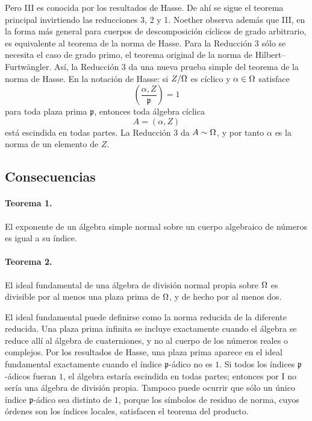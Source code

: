 Pero III es conocida por los resultados de Hasse. De ahí se sigue el teorema principal invirtiendo las reducciones 3, 2 y 1. Noether observa además que III, en la forma más general para cuerpos de descomposición cíclicos de grado arbitrario, es equivalente al teorema de la norma de Hasse. Para la Reducción 3 sólo se necesita el caso de grado primo, el teorema original de la norma de Hilbert--Furtwängler. Así, la Reducción 3 da una nueva prueba simple del teorema de la norma de Hasse. En la notación de Hasse: si \(Z/\Omega\) es cíclico y \(\alpha\in\Omega\) satisface
\[
        \left(\frac{\alpha,Z}{\mathfrak p}\right)=1
\]
para toda plaza prima \(\mathfrak p\), entonces toda álgebra cíclica
\[
        A=(\alpha,Z)
\]
está escindida en todas partes. La Reducción 3 da \(A\sim\Omega\), y por tanto \(\alpha\) es la norma de un elemento de \(Z\).

\subsection*{Consecuencias}

\paragraph{Teorema 1.}
El exponente de un álgebra simple normal sobre un cuerpo algebraico de números es igual a su índice.

\paragraph{Teorema 2.}
El ideal fundamental de una álgebra de división normal propia sobre \(\Omega\) es divisible por al menos una plaza prima de \(\Omega\), y de hecho por al menos dos.

El ideal fundamental puede definirse como la norma reducida de la diferente reducida. Una plaza prima infinita se incluye exactamente cuando el álgebra se reduce allí al álgebra de cuaterniones, y no al cuerpo de los números reales o complejos. Por los resultados de Hasse, una plaza prima aparece en el ideal fundamental exactamente cuando el índice \(\mathfrak p\)-ádico no es \(1\). Si todos los índices \(\mathfrak p\)-ádicos fueran \(1\), el álgebra estaría escindida en todas partes; entonces por I no sería una álgebra de división propia. Tampoco puede ocurrir que sólo un único índice \(\mathfrak p\)-ádico sea distinto de \(1\), porque los símbolos de residuo de norma, cuyos órdenes son los índices locales, satisfacen el teorema del producto.

